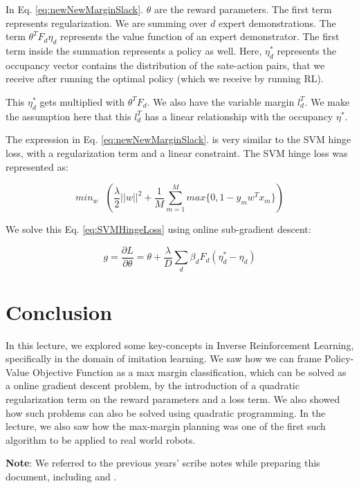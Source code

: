 \documentclass[11pt]{article}
\begin{document}
In Eq. \ref{eq:newNewMarginSlack}. $\theta$ are the reward parameters. The first term represents regularization. We are summing over $d$ expert demonstrations. The term $\theta^T F_d \eta_d$ represents the value function of an expert demonstrator. The first term inside the summation represents a policy as well. Here, $\eta^*_d$ represents the occupancy vector contains the distribution of the sate-action pairs, that we receive after running the optimal policy (which we receive by running RL). 

This $\eta^*_d$ gets multiplied with $\theta^T F_d$. We also have the variable margin $l^T_d$. We make the assumption here that this $l^T_d$ has a linear relationship with the occupancy $\eta^*$.

The expression in Eq. \ref{eq:newNewMarginSlack}. is very similar to the SVM hinge loss, with a regularization term and a linear constraint. The SVM hinge loss was represented as:

\begin{equation}
    min_w \texttt{ }(\dfrac{\lambda}{2}||w||^2 + \dfrac{1}{M}\sum_{m=1}^{M}max\{0, 1 - y_m w^T x_m\})
\label{eq:SVMHingeLoss}\end{equation}

We solve this Eq. \ref{eq:SVMHingeLoss} using online sub-gradient descent:

\begin{equation}
    g = \dfrac{\partial L}{\partial \theta} = \theta + \dfrac{\lambda}{D}\sum_d \beta_d F_d (\eta^*_d - \eta_d)
\end{equation}

\section{Conclusion}

In this lecture, we explored some key-concepts in Inverse Reinforcement Learning, specifically in the domain of imitation learning. We saw how we can frame Policy-Value Objective Function as a max margin classification, which can be solved as a online gradient descent problem, by the introduction of a quadratic regularization term on the reward parameters and a loss term. We also showed how such problems can also be solved using quadratic programming. In the lecture, we also saw how the max-margin planning was one of the first such algorithm to be applied to real world robots.

\textbf{Note}: We referred to the previous years' scribe notes while preparing this document, including \cite{Navaro2021} and \cite{Kai2021}.
\end{document}
